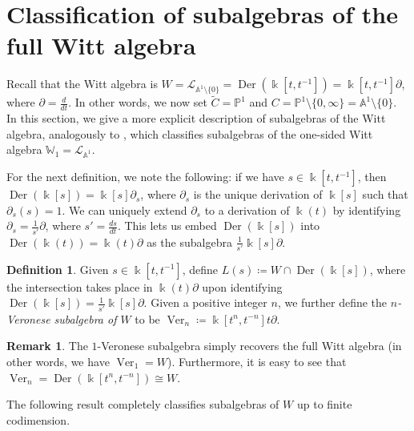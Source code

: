 \documentclass[12pt]{amsart}
\theoremstyle{plain}
\theoremstyle{definition}
\newtheorem{definition}[theorem]{Definition}
\newtheorem{remark}[theorem]{Remark}
\numberwithin{equation}{section}
\def\L{\mathcal{L}}
\def\Aa{\mathbb{A}}
\def\PP{\mathbb{P}}
\def\WW{\mathbb{W}}
\def\kk{\Bbbk}
\DeclareMathOperator{\Der}{Der}
\DeclareMathOperator{\Ver}{Ver}
\def\del{\partial}
\def\nonzero{\setminus \{0\}}
\newcommand{\diff}[1]{\frac{d}{d#1}}
\begin{document}
\section{Classification of subalgebras of the full Witt algebra}\label{sec:classification Witt}

Recall that the Witt algebra is $W = \L_{\Aa^1 \nonzero} = \Der(\kk[t,t^{-1}]) = \kk[t,t^{-1}]\del$, where $\del = \diff{t}$. In other words, we now set $\widetilde{C} = \PP^1$ and $C = \PP^1 \setminus \{0,\infty\} = \Aa^1 \setminus \{0\}$. In this section, we give a more explicit description of subalgebras of the Witt algebra, analogously to \cite[Theorem 2.8]{BellBuzaglo}, which classifies subalgebras of the one-sided Witt algebra $\WW_1 = \L_{\Aa^1}$.

For the next definition, we note the following: if we have $s \in \kk[t,t^{-1}]$, then $\Der(\kk[s]) = \kk[s]\del_s$, where $\del_s$ is the unique derivation of $\kk[s]$ such that $\del_s(s) = 1$. We can uniquely extend $\del_s$ to a derivation of $\kk(t)$ by identifying $\del_s = \frac{1}{s'}\del$, where $s' = \frac{ds}{dt}$. This lets us embed $\Der(\kk[s])$ into $\Der(\kk(t)) = \kk(t)\del$ as the subalgebra $\frac{1}{s'}\kk[s]\del$.

\begin{definition}\label{def:L(s)}
    Given $s \in \kk[t,t^{-1}]$, define $L(s) \coloneqq W \cap \Der(\kk[s])$, where the intersection takes place in $\kk(t)\del$ upon identifying $\Der(\kk[s]) = \frac{1}{s'}\kk[s]\del$. Given a positive integer $n$, we further define the \emph{$n$-Veronese subalgebra of $W$} to be $\Ver_n \coloneqq \kk[t^n,t^{-n}]t\del$.
\end{definition}

\begin{remark}\label{rem:Veronese}
    The $1$-Veronese subalgebra simply recovers the full Witt algebra (in other words, we have $\Ver_1 = W$). Furthermore, it is easy to see that $\Ver_n = \Der(\kk[t^n,t^{-n}]) \cong W$.
\end{remark}

The following result completely classifies subalgebras of $W$ up to finite codimension.
\end{document}
